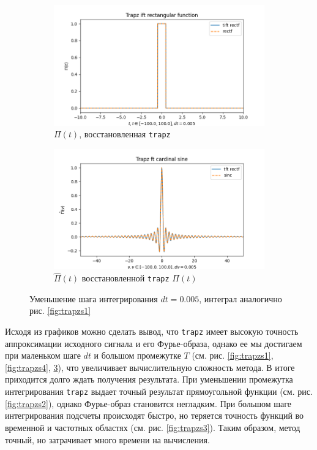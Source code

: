 \documentclass[a4paper, 12pt]{article}
\begin{document}
    \begin{figure}[H]
        \centering
        \begin{subfigure}{0.45\textwidth}
            \centering
            \includegraphics[width=\linewidth]{5_tiftr.png}
            \caption{$\Pi(t)$, восстановленная \texttt{trapz}}
            \label{fig:trectf5}
        \end{subfigure}
        \hspace{5mm}
        \begin{subfigure}{0.45\textwidth}
            \centering
            \includegraphics[width=\linewidth]{5_tftr.png}
            \caption{$\hat{\Pi}(t)$ восстановленной \texttt{trapz} $\Pi(t)$}
            \label{fig:tsinc5}
        \end{subfigure}
        \caption{Уменьшение шага интегрирования $dt=0.005$, интеграл аналогично рис. \ref{fig:trapzs1}}
        \label{fig:trapzs5}
    \end{figure}


    Исходя из графиков можно сделать вывод, что \texttt{trapz} имеет высокую точность аппроксимации исходного сигнала и
    его Фурье-образа, однако ее мы достигаем при маленьком шаге $dt$ и большом промежутке $T$ (см. рис. \ref{fig:trapzs1}, \ref{fig:trapzs4}, \ref{fig:trapzs5}),
    что увеличивает вычислительную сложность метода. В итоге приходится долго ждать получения результата. При уменьшении
    промежутка интегрирования \texttt{trapz} выдает точный результат прямоугольной функции (см. рис. \ref{fig:trapzs2}),
    однако Фурье-образ становится негладким. При большом шаге интегрирования подсчеты происходят быстро, но
    теряется точность функций во временной и частотных областях (см. рис. \ref{fig:trapzs3}). Таким образом, метод точный,
    но затрачивает много времени на вычисления.
\end{document}
